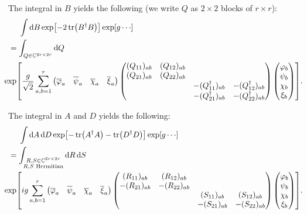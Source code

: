 \documentclass{article}
\begin{document}
The integral in $B$ yields the following (we write $Q$ as $2\times 2$ blocks of $r\times r$):
\begin{align}
    & \phantom{{}={}} \int \dd{B} \exp[-2\tr(B^\dagger B)] \exp[g \cdots] \\
    &= \int_{Q\in \mathbb{C}^{2r\times 2r}} \dd{Q} \\
    &{\phantom{{}={}}} \hspace{-2em} \exp[\frac{g}{\sqrt{2}}\sum_{a,b=1}^r \begin{pmatrix}
        \overline{\varphi}_a & \overline{\psi}_a & \overline{\chi}_a & \overline{\xi}_a
    \end{pmatrix} \begin{pmatrix}
        (Q_{11})_{ab} & (Q_{12})_{ab} & & \\
        (Q_{21})_{ab} & (Q_{22})_{ab} & & \\
        & & -(Q^\dagger_{11})_{ab} & -(Q^\dagger_{12})_{ab} \\
        & & -(Q^\dagger_{21})_{ab} & -(Q^\dagger_{22})_{ab}
    \end{pmatrix} \begin{pmatrix}
        \varphi_b \\ \psi_b \\ \chi_b  \\ \xi_b
    \end{pmatrix}].
\end{align}

The integral in $A$ and $D$ yields the following:
\begin{align}
    & \phantom{{}={}} \int \dd{A} \dd{D} \exp[-\tr(A^\dagger A) - \tr(D^\dagger D)] \exp[g \cdots] \\
    &= \int_{\substack{R,S\in \mathbb{C}^{2r\times 2r} \\ R,S \text{ Hermitian}}} \dd{R} \dd{S} \\
    &{\phantom{{}={}}} \hspace{-2em} \exp[i g\sum_{a,b=1}^r \begin{pmatrix}
        \overline{\varphi}_a & \overline{\psi}_a & \overline{\chi}_a & \overline{\xi}_a
    \end{pmatrix} \begin{pmatrix}
        (R_{11})_{ab} & (R_{12})_{ab} & & \\
        -(R_{21})_{ab} & -(R_{22})_{ab} & & \\
        & & (S_{11})_{ab} & (S_{12})_{ab}  \\
        & & -(S_{21})_{ab} & -(S_{22})_{ab}
    \end{pmatrix} \begin{pmatrix}
        \varphi_b \\ \psi_b \\ \chi_b  \\ \xi_b
    \end{pmatrix}].
\end{align}
\end{document}
